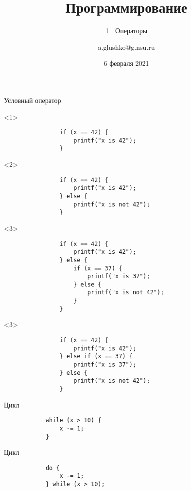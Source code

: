 \documentclass[aspectratio=169,14pt]{beamer}
\title{Программирование}
\subtitle{1 | Операторы}
\author{a.glushko@g.nsu.ru}
\date{6 февраля 2021}
\begin{document}
    \begin{frame}
        \titlepage
    \end{frame}

    \begin{frame}[fragile]{Условный оператор}
        \begin{onlyenv}<1>
            \begin{lstlisting}
                if (x == 42) {
                    printf("x is 42");
                }
            \end{lstlisting}
        \end{onlyenv}
        \begin{onlyenv}<2>
            \begin{lstlisting}
                if (x == 42) {
                    printf("x is 42");
                } else {
                    printf("x is not 42");
                }
            \end{lstlisting}
        \end{onlyenv}
        \begin{onlyenv}<3>
            \begin{lstlisting}
                if (x == 42) {
                    printf("x is 42");
                } else {
                    if (x == 37) {
                        printf("x is 37");
                    } else {
                        printf("x is not 42");
                    }
                }
            \end{lstlisting}
        \end{onlyenv}
        \begin{onlyenv}<3>
            \begin{lstlisting}
                if (x == 42) {
                    printf("x is 42");
                } else if (x == 37) {
                    printf("x is 37");
                } else {
                    printf("x is not 42");
                }
            \end{lstlisting}
        \end{onlyenv}
    \end{frame}

    \begin{frame}[fragile]{Цикл}
        \begin{lstlisting}
            while (x > 10) {
                x -= 1;
            }
        \end{lstlisting}
    \end{frame}

    \begin{frame}[fragile]{Цикл}
        \begin{lstlisting}
            do {
                x -= 1;
            } while (x > 10);
        \end{lstlisting}
    \end{frame}
\end{document}
